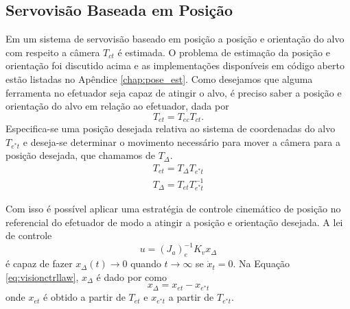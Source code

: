 
\subsection{Servovisão Baseada em Posição}
Em um sistema de servovisão baseado em posição a posição e orientação do alvo com respeito a câmera ${T}_{ct}$ é estimada. O problema de estimação da posição e orientação foi discutido acima e as implementações disponíveis em código aberto estão listadas no Apêndice \ref{chap:pose_est}. Como desejamos que alguma ferramenta no efetuador seja capaz de atingir o alvo, é preciso saber a posição e orientação do alvo em relação ao efetuador, dada por
\begin{equation}
T_{et} = T_{ec} T_{ct}.
\end{equation} 
Especifica-se uma posição desejada relativa ao sistema de coordenadas do alvo  ${T}_{e^*t}$ e deseja-se determinar o movimento necessário para mover a câmera para a posição desejada, que chamamos de ${T}_\Delta$.
\begin{align}
 {T}_{et} =  {T}_\Delta {T}_{e^*t} \\
 {T}_\Delta  =   {T}_{et} {T}_{e^*t}^{-1}
\end{align}

Com isso é possível aplicar uma estratégia de controle cinemático de posição no referencial do efetuador de modo a atingir a posição e orientação desejada. A lei de controle
\begin{equation} \label{eq:visionctrllaw}
{u} = ({J}_a)_e^{-1}{K}_v x_\Delta
\end{equation}
é capaz de fazer ${x_\Delta}(t) \rightarrow 0$ quando $t \rightarrow \infty$ se $\dot{{x}}_t = 0$. Na Equação \eqref{eq:visionctrllaw}, $x_\Delta$ é dado por como
\begin{equation}
x_\Delta = {x}_{et} - {x}_{e^*t}
\end{equation}
onde ${x}_{et}$ é obtido a partir de $T_{et}$ e ${x}_{e^*t}$ a partir de ${T}_{e^*t}$.


